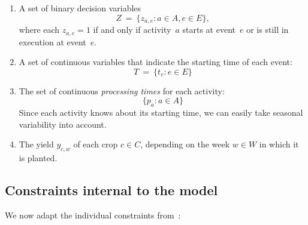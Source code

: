 \documentclass[11pt,reqno]{amsart}
\numberwithin{equation}{section}
\begin{document}
\begin{enumerate}
\item A set of binary decision variables 
  \[
     Z
     \ = \
     \big\{z_{a,e}: a\in A, e\in E\big\},
  \]
  where each $z_{a,e}=1$ if and only if activity~$a$ starts at
  event~$e$ or is still in execution at event~$e$.

\smallskip
\item A set of continuous variables that indicate the starting time of each event:
  \[
     T
     \ = \
     \big\{t_e : e\in E\big\}
  \]

\smallskip
\item The set of continuous \emph{processing times} for each activity:
  \[
      \{p_a:a\in A\}
  \]  
  Since each activity knows about its starting time, we can easily take seasonal
  variability into account.

  \smallskip

\item The yield $y_{c,w}$ of each crop $c\in C$, depending on the week $w\in W$ in which
  it is planted.

\end{enumerate}

\subsection{Constraints internal to the model}

We now adapt the individual constraints from~\cite{artigues-etal11}:
\end{document}
